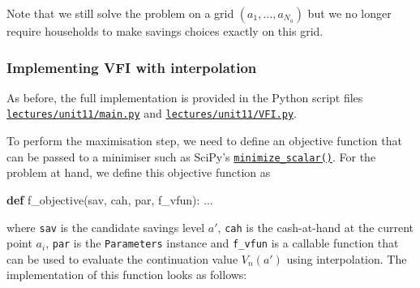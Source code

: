 \documentclass{scrartcl}
\newenvironment{Shaded}{}{}
\newcommand{\KeywordTok}[1]{\textcolor[rgb]{0.00,0.44,0.13}{\textbf{{#1}}}}
\newcommand{\NormalTok}[1]{{#1}}
\begin{document}
Note that we still solve the problem on a grid \((a_1, \dots, a_{N_a})\)
but we no longer require households to make savings choices exactly on
this grid.

    \hypertarget{implementing-vfi-with-interpolation}{%
\subsubsection*{Implementing VFI with
interpolation}\label{implementing-vfi-with-interpolation}}

As before, the full implementation is provided in the Python script
files
\href{../lectures/unit11/main.py}{\texttt{lectures/unit11/main.py}} and
\href{../lectures/unit11/VFI.py}{\texttt{lectures/unit11/VFI.py}}.

To perform the maximisation step, we need to define an objective
function that can be passed to a minimiser such as SciPy's
\href{https://docs.scipy.org/doc/scipy/reference/generated/scipy.optimize.minimize_scalar.html}{\texttt{minimize\_scalar()}}.
For the problem at hand, we define this objective function as

\begin{Shaded}
\begin{Highlighting}[]
\KeywordTok{def}\NormalTok{ f\_objective(sav, cah, par, f\_vfun):}
\NormalTok{    ...}
\end{Highlighting}
\end{Shaded}

where \texttt{sav} is the candidate savings level \(a'\), \texttt{cah}
is the cash-at-hand at the current point \(a_i\), \texttt{par} is the
\texttt{Parameters} instance and \texttt{f\_vfun} is a callable function
that can be used to evaluate the continuation value \(V_n(a')\) using
interpolation. The implementation of this function looks as follows:
\end{document}
